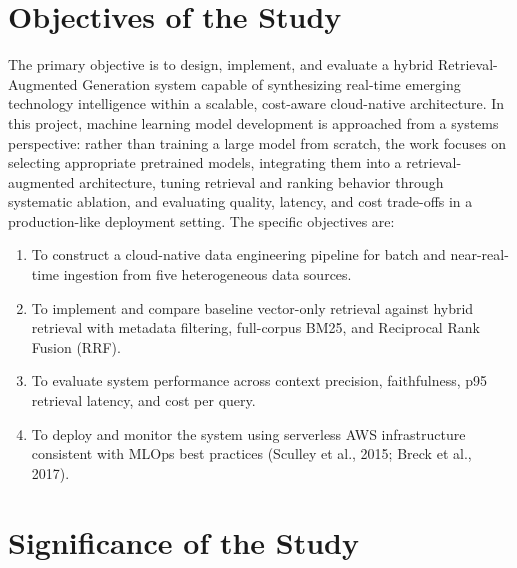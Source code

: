 \section{Objectives of the Study}
\label{sec:objectives}

The primary objective is to design, implement, and evaluate a hybrid Retrieval-Augmented Generation system capable of synthesizing real-time emerging technology intelligence within a scalable, cost-aware cloud-native architecture. In this project, machine learning model development is approached from a systems perspective: rather than training a large model from scratch, the work focuses on selecting appropriate pretrained models, integrating them into a retrieval-augmented architecture, tuning retrieval and ranking behavior through systematic ablation, and evaluating quality, latency, and cost trade-offs in a production-like deployment setting. The specific objectives are:

\begin{enumerate}[leftmargin=0.5in]
  \item To construct a cloud-native data engineering pipeline for batch and near-real-time ingestion from five heterogeneous data sources.
  \item To implement and compare baseline vector-only retrieval against hybrid retrieval with metadata filtering, full-corpus BM25, and Reciprocal Rank Fusion (RRF).
  \item To evaluate system performance across context precision, faithfulness, p95 retrieval latency, and cost per query.
  \item To deploy and monitor the system using serverless AWS infrastructure consistent with MLOps best practices (Sculley et al., 2015; Breck et al., 2017).
\end{enumerate}

\section{Significance of the Study}
\label{sec:significance}


